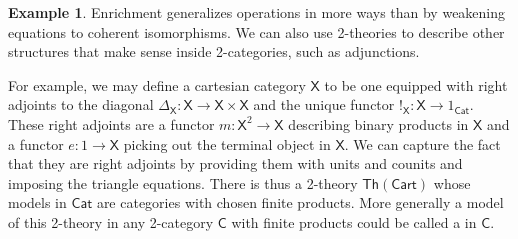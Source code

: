 \documentclass{amsart}
\newcommand{\define}[1]{{\bf \boldmath{#1}}}
\theoremstyle{definition}
\newtheorem{example}[theorem]{Example}
\newcommand{\Th}{\mathsf{Th}}
\newcommand{\Cat}{\mathsf{Cat}}
\newcommand{\C}{\mathsf{C}}
\newcommand{\X}{\mathsf{X}}
\newcommand{\maps}{\colon}
\begin{document}
\begin{example}
 Enrichment generalizes operations in more ways than by weakening equations to coherent isomorphisms.  We can also use 2-theories to describe other structures that make sense inside 2-categories, such as adjunctions. 
  
For example, we may define a cartesian category $\X$ to be one equipped with right adjoints to the diagonal $\Delta_\X\maps \X \to \X \times \X$ and the unique functor $!_\X \maps \X \to 1_\Cat$.    These right adjoints are a functor $m \maps \X^2 \to \X$ describing binary products in $\X$ and a functor $e \maps 1 \to \X$ picking out the terminal object in $\X$.   We can capture the fact that they are right adjoints by providing them with units and counits and imposing the triangle equations.   There is thus a 2-theory $\Th(\mathsf{Cart})$ whose models in $\Cat$ are categories with chosen finite products.  More generally a model of this 2-theory in any 2-category $\C$ with finite products could be called a \define{cartesian object} in $\C$.  


\end{example}
\end{document}
